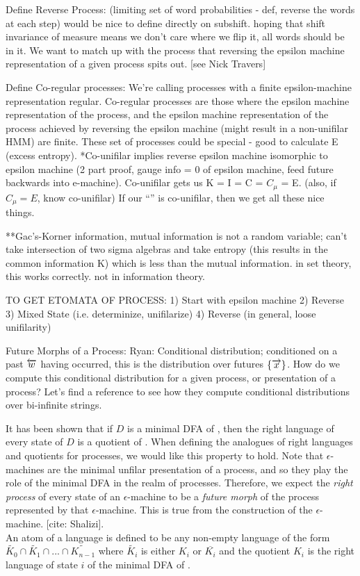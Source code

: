 \documentclass[prl,twocolumn,superscriptaddress,preprintnumbers,floatfix]{revtex4-1}
\begin{document}
Define Reverse Process: (limiting set of word probabilities - def, reverse the words at each step) would be nice to define directly on subshift. hoping that shift invariance of measure means we don't care where we flip it, all words should be in it.  We want to match up with the process that reversing the epsilon machine representation of a given process spits out. [see Nick Travers]

Define Co-regular processes: We're calling processes with a finite epsilon-machine representation regular. Co-regular processes are those where the epsilon machine representation of the process, and the epsilon machine representation of the process achieved by reversing the epsilon machine (might result in a non-unifilar HMM) are finite.  These set of processes could be special - good to calculate E (excess entropy).  *Co-unifilar implies reverse epsilon machine isomorphic to epsilon machine (2 part proof, gauge info = 0 of epsilon machine, feed future backwards into e-machine). Co-unifilar gets us K = I = C = $C_{\mu}$ = E.  (also, if $C_{\mu} = E$, know co-unifilar) If our ``\etomata'' is co-unifilar, then we get all these nice things.  

**Gac's-Korner information, mutual information is not a random variable; can't take intersection of two sigma algebras and take entropy (this results in the common information K) which is less than the mutual information. in set theory, this works correctly. not in information theory.  

TO GET ETOMATA OF PROCESS:
1) Start with epsilon machine
2) Reverse 
3) Mixed State (i.e. determinize, unifilarize)
4) Reverse (in general, loose unifilarity)

Future Morphs of a Process:
Ryan: Conditional distribution; conditioned on a past $\overleftarrow{w}$ having occurred, this is the distribution over futures $\{ \overrightarrow{x}\}$.  
How do we compute this conditional distribution for a given process, or presentation of a process? 
Let's find a reference to see how they compute conditional distributions over bi-infinite strings.

It has been shown that if $D$ is a minimal DFA of \Language, then the right language of every state of $D$ is a quotient of \Language.  When defining the analogues of right languages and quotients for processes, we would like this property to hold.  Note that $\epsilon$-machines are the minimal unfilar presentation of a process, and so they play the role of the minimal DFA in the realm of processes.  Therefore, we expect the \emph{right process} of every state of an $\epsilon$-machine to be a \emph{future morph} of the process represented by that $\epsilon$-machine.  This is true from the construction of the $\epsilon$-machine. [cite: Shalizi].  
\\
An atom of a language \Language is defined to be any non-empty language of the form $\widetilde{K_0} \cap \widetilde{K_1} \cap ... \cap \widetilde{K_{n-1}}$ where $\widetilde{K_i}$ is either $K_i$ or $\overline{K_i}$ and the quotient $K_i$ is the right language of state $i$ of the minimal DFA of \Language.   
\end{document}

